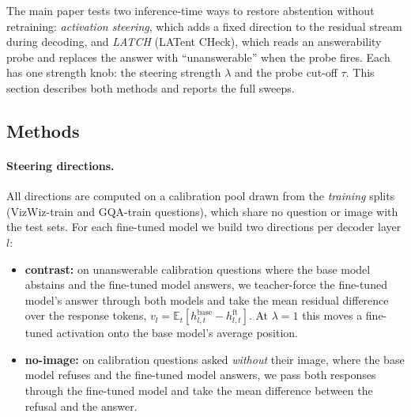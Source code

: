 The main paper tests two inference-time ways to restore abstention without retraining:
\emph{activation steering}, which adds a fixed direction to the residual stream during
decoding, and \emph{LATCH} (LATent CHeck), which reads an answerability probe and replaces the
answer with ``unanswerable'' when the probe fires. Each has one strength knob: the steering
strength $\lambda$ and the probe cut-off $\tau$. This section describes both methods and
reports the full sweeps.

\subsection{Methods}
\label{sec:supp_steer_method}

\paragraph{Steering directions.}
All directions are computed on a calibration pool drawn from the \emph{training} splits
(VizWiz-train and GQA-train questions), which share no question or image with the test
sets. For each fine-tuned model we build two directions per decoder layer $l$:
\begin{itemize}\itemsep0pt
  \item \textbf{contrast:} on unanswerable calibration questions where the base model
        abstains and the fine-tuned model answers, we teacher-force the fine-tuned model's
        answer through both models and take the mean residual difference over the response
        tokens, $v_l=\mathbb{E}_t[h^{\text{base}}_{l,t}-h^{\text{ft}}_{l,t}]$. At $\lambda{=}1$
        this moves a fine-tuned activation onto the base model's average position.
  \item \textbf{no-image:} on calibration questions asked \emph{without} their image, where
        the base model refuses and the fine-tuned model answers, we pass both responses
        through the fine-tuned model and take the mean difference between the refusal and the
        answer.
\end{itemize}


